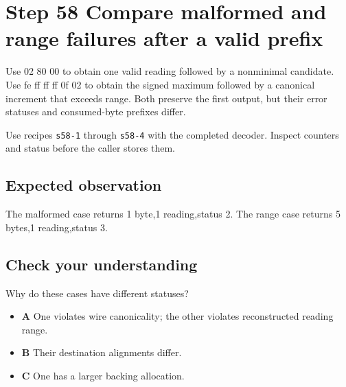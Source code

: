 \section{Step 58 Compare malformed and range failures after a valid prefix}\label{delta-s58}

Use 02 80 00 to obtain one valid reading followed by a nonminimal candidate. Use fe ff ff ff 0f 02 to obtain the signed maximum followed by a canonical increment that exceeds range. Both preserve the first output, but their error statuses and consumed-byte prefixes differ.

Use recipes \texttt{s58-1} through \texttt{s58-4} with the completed decoder. Inspect counters and status before the caller stores them.

\subsection{Expected observation}
The malformed case returns 1 byte,1 reading,status 2. The range case returns 5 bytes,1 reading,status 3.

\subsection{Check your understanding}
Why do these cases have different statuses?

\begin{itemize}
  \item \textbf{A} One violates wire canonicality; the other violates reconstructed reading range.
  \item \textbf{B} Their destination alignments differ.
  \item \textbf{C} One has a larger backing allocation.
\end{itemize}
